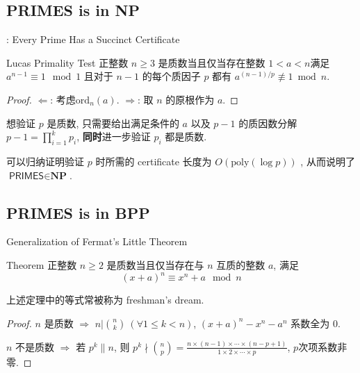 \documentclass{beamer}
\def\le{\leqslant}
\def\ge{\geqslant}
\def\ord{\textrm{ord}}
\begin{document}
\subsection{PRIMES is in NP}
\begin{frame}{\cite{Pratt75}: Every Prime Has a Succinct Certificate}
	\begin{block}{Lucas Primality Test}
		正整数 $n \ge 3$ 是质数当且仅当存在整数 $1 < a < n$满足 $a^{n-1} \equiv 1 \mod 1$ 且对于 $n-1$ 的每个质因子 $p$ 都有 $a^{(n-1)/p} \not\equiv 1 \bmod n$.
	\end{block}
	\begin{proof}
		$\Leftarrow$: 考虑$\ord_{n}(a)$. $\Rightarrow$: 取 $n$ 的原根作为 $a$.
	\end{proof}
	
	想验证 $p$ 是质数, 只需要给出满足条件的 $a$ 以及 $p - 1$ 的质因数分解 $p - 1 = \prod\limits_{i=1}^{k}p_i$, \textbf{同时}进一步验证 $p_i$ 都是质数.  

	可以归纳证明验证 $p$ 时所需的 certificate 长度为 $O(\textrm{poly}(\log p))$ , 从而说明了 $\textsf{PRIMES} \in \textbf{NP}$.	
	
\end{frame}

\subsection{PRIMES is in BPP}
\begin{frame}{Generalization of Fermat's Little Theorem}
	\begin{block}{Theorem}
		正整数 $n \ge 2$ 是质数当且仅当存在与 $n$ 互质的整数 $a$, 满足 $$(x + a)^n \equiv x^n + a \mod n$$
	\end{block}

	上述定理中的等式常被称为 freshman's dream.

	\begin{proof}
		$n$ 是质数 $\Rightarrow$ $n | \binom{n}{k} \ (\forall 1 \le k < n)$, $(x + a)^n - x^n - a^n$ 系数全为 $0$.

		$n$ 不是质数 $\Rightarrow$ 若 $p^k \| n$, 则 $p^k \nmid \binom{n}{p} = \frac{n \times (n-1) \times \cdots \times (n-p+1)}{1 \times 2 \times \cdots \times p}$, $p$次项系数非零.
	\end{proof}
	
\end{frame}
\end{document}
